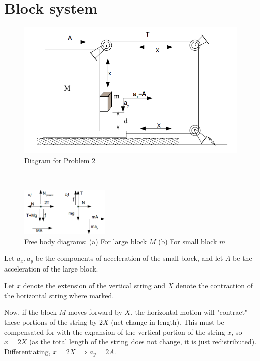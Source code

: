 \documentclass[12pt]{article}
\begin{document}
\section{Block system}
\begin{figure}[h]
\centering
\includegraphics[scale=0.6]{2D}
\caption{Diagram for Problem 2}

\label{fig:2d}
\end{figure}

 ~\\
\begin{figure}
  \begin{center}
    \includegraphics[width=0.38\textwidth]{2F}
  \end{center}
  
  \caption{\footnotesize Free body diagrams: (a) For large block $M$ (b) For small block $m$}
  \label{fig:2f}
\end{figure}

Let $a_x,a_y$ be the components of acceleration of the small block, and let $A$ be the acceleration of the large block.

Let $x$ denote the extension of the vertical string  and $X$ denote the contraction of the horizontal string where marked.

Now, if the block $M$ moves forward by $X$, the horizontal motion will "contract" these portions of the string by $2X$ (net change in length). This must be compensated for with the  expansion of the vertical portion of the string $x$, so $x=2X$ (as the total length of the string does not change, it is just redistributed). Differentiating, $\ddot x=2\ddot X\implies a_y=2A$.
\end{document}
